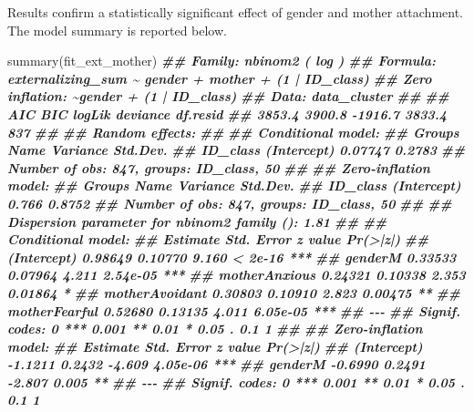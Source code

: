 \documentclass[
]{book}
\newenvironment{Shaded}{\begin{snugshade}}{\end{snugshade}}
\newcommand{\DocumentationTok}[1]{\textcolor[rgb]{0.56,0.35,0.01}{\textbf{\textit{#1}}}}
\newcommand{\FunctionTok}[1]{\textcolor[rgb]{0.00,0.00,0.00}{#1}}
\newcommand{\NormalTok}[1]{#1}
\begin{document}
Results confirm a statistically significant effect of gender and mother attachment. The model summary is reported below.

\begin{Shaded}
\begin{Highlighting}[]
\FunctionTok{summary}\NormalTok{(fit\_ext\_mother)}
\DocumentationTok{\#\#  Family: nbinom2  ( log )}
\DocumentationTok{\#\# Formula:          externalizing\_sum \textasciitilde{} gender + mother + (1 | ID\_class)}
\DocumentationTok{\#\# Zero inflation:                     \textasciitilde{}gender + (1 | ID\_class)}
\DocumentationTok{\#\# Data: data\_cluster}
\DocumentationTok{\#\# }
\DocumentationTok{\#\#      AIC      BIC   logLik deviance df.resid }
\DocumentationTok{\#\#   3853.4   3900.8  {-}1916.7   3833.4      837 }
\DocumentationTok{\#\# }
\DocumentationTok{\#\# Random effects:}
\DocumentationTok{\#\# }
\DocumentationTok{\#\# Conditional model:}
\DocumentationTok{\#\#  Groups   Name        Variance Std.Dev.}
\DocumentationTok{\#\#  ID\_class (Intercept) 0.07747  0.2783  }
\DocumentationTok{\#\# Number of obs: 847, groups:  ID\_class, 50}
\DocumentationTok{\#\# }
\DocumentationTok{\#\# Zero{-}inflation model:}
\DocumentationTok{\#\#  Groups   Name        Variance Std.Dev.}
\DocumentationTok{\#\#  ID\_class (Intercept) 0.766    0.8752  }
\DocumentationTok{\#\# Number of obs: 847, groups:  ID\_class, 50}
\DocumentationTok{\#\# }
\DocumentationTok{\#\# Dispersion parameter for nbinom2 family (): 1.81 }
\DocumentationTok{\#\# }
\DocumentationTok{\#\# Conditional model:}
\DocumentationTok{\#\#                Estimate Std. Error z value Pr(\textgreater{}|z|)    }
\DocumentationTok{\#\# (Intercept)     0.98649    0.10770   9.160  \textless{} 2e{-}16 ***}
\DocumentationTok{\#\# genderM         0.33533    0.07964   4.211 2.54e{-}05 ***}
\DocumentationTok{\#\# motherAnxious   0.24321    0.10338   2.353  0.01864 *  }
\DocumentationTok{\#\# motherAvoidant  0.30803    0.10910   2.823  0.00475 ** }
\DocumentationTok{\#\# motherFearful   0.52680    0.13135   4.011 6.05e{-}05 ***}
\DocumentationTok{\#\# {-}{-}{-}}
\DocumentationTok{\#\# Signif. codes:  0 \textquotesingle{}***\textquotesingle{} 0.001 \textquotesingle{}**\textquotesingle{} 0.01 \textquotesingle{}*\textquotesingle{} 0.05 \textquotesingle{}.\textquotesingle{} 0.1 \textquotesingle{} \textquotesingle{} 1}
\DocumentationTok{\#\# }
\DocumentationTok{\#\# Zero{-}inflation model:}
\DocumentationTok{\#\#             Estimate Std. Error z value Pr(\textgreater{}|z|)    }
\DocumentationTok{\#\# (Intercept)  {-}1.1211     0.2432  {-}4.609 4.05e{-}06 ***}
\DocumentationTok{\#\# genderM      {-}0.6990     0.2491  {-}2.807    0.005 ** }
\DocumentationTok{\#\# {-}{-}{-}}
\DocumentationTok{\#\# Signif. codes:  0 \textquotesingle{}***\textquotesingle{} 0.001 \textquotesingle{}**\textquotesingle{} 0.01 \textquotesingle{}*\textquotesingle{} 0.05 \textquotesingle{}.\textquotesingle{} 0.1 \textquotesingle{} \textquotesingle{} 1}
\end{Highlighting}
\end{Shaded}
\end{document}
